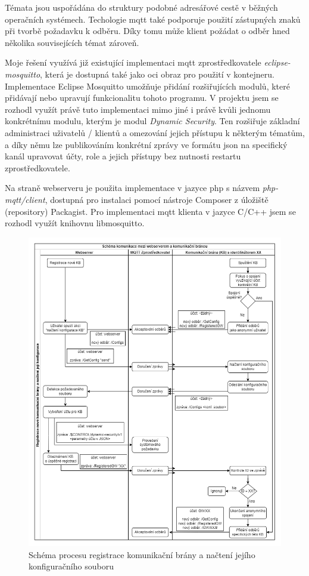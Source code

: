 Témata jsou uspořádána do struktury podobné adresářové cestě v běžných operačních systémech. Techologie \acrshort{mqtt} také podporuje použití zástupných znaků při tvorbě požadavku k odběru. Díky tomu může klient požádat o odběr hned několika souvisejících témat zároveň.

Moje řešení využívá již existující implementaci \acrshort{mqtt} zprostředkovatele \emph{eclipse-mosquitto}, která je dostupná také jako \acrshort{oci} obraz pro použití v kontejneru. Implementace Eclipse Mosquitto umožňuje přidání rozšiřujících modulů, které přidávají nebo upravují funkcionalitu tohoto programu. V projektu jsem se rozhodl využít právě tuto implementaci mimo jiné i právě kvůli jednomu konkrétnímu modulu, kterým je modul \emph{Dynamic Security}. Ten rozšiřuje základní administraci uživatelů / klientů a omezování jejich přístupu k některým tématům, a díky němu lze publikováním konkrétní zprávy ve formátu \acrshort{json} na specifický kanál
upravovat účty, role a jejich přístupy bez nutnosti restartu zprostředkovatele.

Na straně webserveru je použita implementace v jazyce \acrshort{php} s názvem \emph{php-mqtt/client}, dostupná pro instalaci pomocí nástroje Composer z úložiště (repository) Packagist. Pro implementaci \acrshort{mqtt} klienta v jazyce C/C++ jsem se rozhodl využít knihovnu libmosquitto.

\begin{figure}[h!]
    \centering
    \includegraphics[width=1\textwidth]{images/mqtt-config.png}
    \caption{Schéma procesu registrace komunikační brány a načtení jejího konfiguračního souboru}
    \label{viewClasses}
\end{figure}

